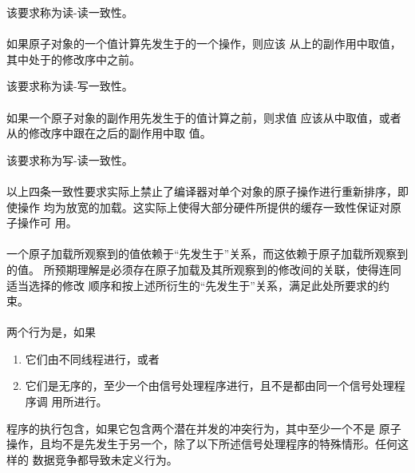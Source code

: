 \begin{note}
  该要求称为读-读一致性。
\end{note}

\paragraph{} %
如果原子对象的一个值计算先发生于的一个操作，则应该
从上的副作用中取值，其中处于的修改序中之前。

\begin{note}
  该要求称为读-写一致性。
\end{note}

\paragraph{} %
如果一个原子对象的副作用先发生于的值计算之前，则求值
应该从中取值，或者从的修改序中跟在之后的副作用中取
值。

\begin{note}
  该要求称为写-读一致性。
\end{note}

\paragraph{} %
\begin{note}
  以上四条一致性要求实际上禁止了编译器对单个对象的原子操作进行重新排序，即使操作
  均为放宽的加载。这实际上使得大部分硬件所提供的缓存一致性保证对\cpp{}原子操作可
  用。
\end{note}

\paragraph{} %
\begin{note}
  一个原子加载所观察到的值依赖于“先发生于”关系，而这依赖于原子加载所观察到的值。
  所预期理解是必须存在原子加载及其所观察到的修改间的关联，使得连同适当选择的修改
  顺序和按上述所衍生的“先发生于”关系，满足此处所要求的约束。
\end{note}

\paragraph{} %
两个行为是，如果
\begin{enumerate}
  \item 它们由不同线程进行，或者
  \item 它们是无序的，至少一个由信号处理程序进行，且不是都由同一个信号处理程序调
        用所进行。
\end{enumerate}
程序的执行包含，如果它包含两个潜在并发的冲突行为，其中至少一个不是
原子操作，且均不是先发生于另一个，除了以下所述信号处理程序的特殊情形。任何这样的
数据竞争都导致未定义行为。

